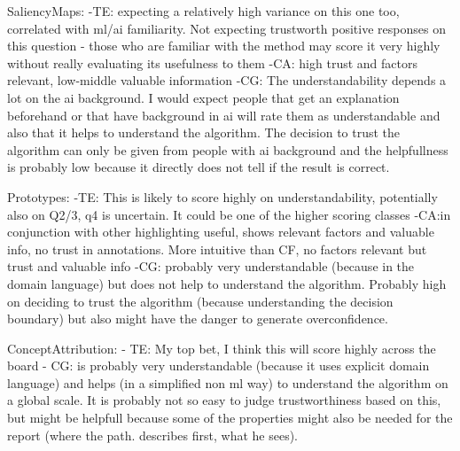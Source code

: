 SaliencyMaps:
-TE: expecting a relatively high variance on this one too, correlated with ml/ai familiarity. Not expecting trustworth positive responses on this question - those who are familiar with the method may score it very highly without really evaluating its usefulness to them
-CA: high trust and factors relevant, low-middle valuable information
-CG: The understandability depends a lot on the ai background. I would expect people that get an explanation beforehand or that have background in ai will rate them as understandable and also that it helps to understand the algorithm. The decision to trust the algorithm can only be given from people with ai background and the helpfullness is probably low because it directly does not tell if the result is correct.


Prototypes:
-TE: This is likely to score highly on understandability, potentially also on Q2/3, q4 is uncertain. It could be one of the higher scoring classes
-CA:in conjunction with other highlighting useful, shows relevant factors and valuable info, no trust in annotations. More intuitive than CF, no factors relevant but trust and valuable info
-CG: probably very understandable (because in the domain language) but does not help to understand the algorithm. Probably high on deciding to trust the algorithm (because understanding the decision boundary) but also might have the danger to generate overconfidence.

ConceptAttribution:
- TE: My top bet, I think this will score highly across the board
- CG: is probably very understandable (because it uses explicit domain language) and helps (in a simplified non ml way) to understand the algorithm on a global scale. It is probably not so easy to judge trustworthiness based on this, but might be helpfull because some of the properties might also be needed for the report (where the path. describes first, what he sees).

